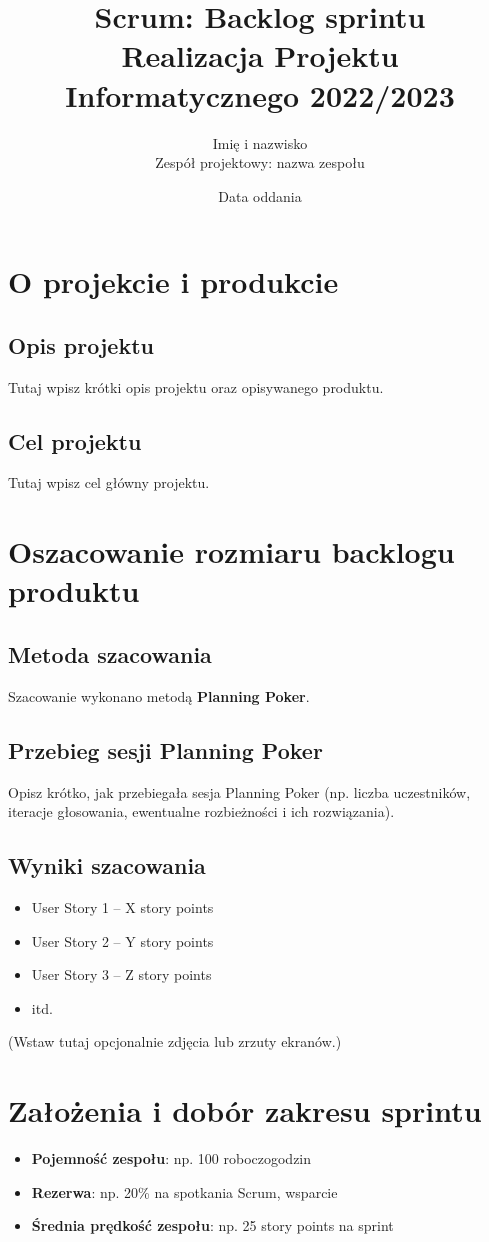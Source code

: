 \documentclass[12pt,a4paper]{article}
\title{Scrum: Backlog sprintu\\\large Realizacja Projektu Informatycznego 2022/2023}
\author{Imię i nazwisko \\ Zespół projektowy: nazwa zespołu}
\date{Data oddania}
\begin{document}
\maketitle
\tableofcontents
\newpage

\section{O projekcie i produkcie}
\subsection{Opis projektu}
Tutaj wpisz krótki opis projektu oraz opisywanego produktu.

\subsection{Cel projektu}
Tutaj wpisz cel główny projektu.

\section{Oszacowanie rozmiaru backlogu produktu}
\subsection{Metoda szacowania}
Szacowanie wykonano metodą \textbf{Planning Poker}.

\subsection{Przebieg sesji Planning Poker}
Opisz krótko, jak przebiegała sesja Planning Poker (np. liczba uczestników, iteracje głosowania, ewentualne rozbieżności i ich rozwiązania).

\subsection{Wyniki szacowania}
\begin{itemize}
    \item User Story 1 – X story points
    \item User Story 2 – Y story points
    \item User Story 3 – Z story points
    \item itd.
\end{itemize}

(Wstaw tutaj opcjonalnie zdjęcia lub zrzuty ekranów.)

\section{Założenia i dobór zakresu sprintu}
\begin{itemize}
    \item \textbf{Pojemność zespołu}: np. 100 roboczogodzin
    \item \textbf{Rezerwa}: np. 20\% na spotkania Scrum, wsparcie
    \item \textbf{Średnia prędkość zespołu}: np. 25 story points na sprint
\end{itemize}
\end{document}
